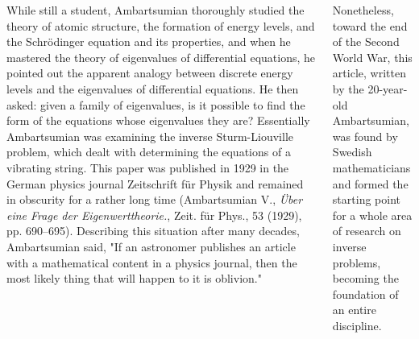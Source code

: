 \documentclass[a0paper,25pt]{tikzposter} %
\begin{document}
\begin{columns}
{While still a student, Ambartsumian thoroughly studied the theory of atomic structure, the formation of energy levels, and the Schr\"odinger equation and its properties, and when he mastered the theory of eigenvalues of differential equations, he pointed out the apparent analogy between discrete energy levels and the eigenvalues of differential equations. He then asked: given a family of eigenvalues, is it possible to find the form of the equations whose eigenvalues they are? Essentially Ambartsumian was examining the inverse Sturm-Liouville problem, which dealt with determining the equations of a vibrating string. This paper was published in 1929 in the German physics journal Zeitschrift f\"ur Physik and remained in obscurity for a rather long time (Ambartsumian V., {\it\"Uber eine Frage der Eigenwerttheorie.}, Zeit. f\"ur Phys., 53 (1929), pp. 690--695). Describing this situation after many decades, Ambartsumian said, "If an astronomer publishes an article with a mathematical content in a physics journal, then the most likely thing that will happen to it is oblivion."

Nonetheless, toward the end of the Second World War, this article, written by the 20-year-old Ambartsumian, was found by Swedish mathematicians and formed the starting point for a whole area of research on inverse problems, becoming the foundation of an entire discipline.
}


\end{columns}
\end{document}
